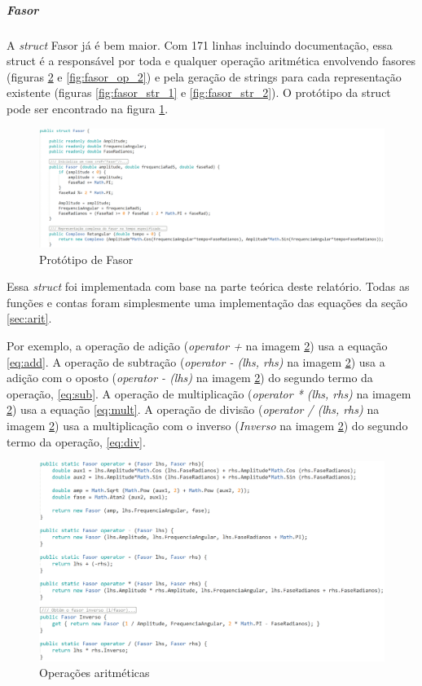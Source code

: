 \documentclass[conference,harvard, brazil]{sbatex}
\begin{document}
	\subparagraph{Fasor}A {\em struct} Fasor já é bem maior. Com 171 linhas incluindo documentação, essa struct é a responsável por toda e qualquer operação aritmética envolvendo fasores (figuras \ref{fig:fasor_op_1} e \ref{fig:fasor_op_2}) e pela geração de strings para cada representação existente (figuras \ref{fig:fasor_str_1} e \ref{fig:fasor_str_2}). O protótipo da struct pode ser encontrado na figura \ref{fig:fasor_prot}.
	\begin{figure}[h]
		\includegraphics[width=\columnwidth]{fasor_1}
		\caption{Protótipo de Fasor}
		\label{fig:fasor_prot}
	\end{figure}
	
	Essa {\em struct} foi implementada com base na parte teórica deste relatório. Todas as funções e contas foram simplesmente uma implementação das equações da seção \ref{sec:arit}.
	
	Por exemplo, a operação de adição ({\em operator +} na imagem \ref{fig:fasor_op_1}) usa a equação \ref{eq:add}. A operação de subtração ({\em operator - (lhs, rhs)} na imagem \ref{fig:fasor_op_1}) usa a adição com o oposto ({\em operator - (lhs)} na imagem \ref{fig:fasor_op_1}) do segundo termo da operação, \ref{eq:sub}.
	A operação de multiplicação  ({\em operator * (lhs, rhs)} na imagem \ref{fig:fasor_op_1}) usa a equação \ref{eq:mult}. A operação de divisão ({\em operator / (lhs, rhs)} na imagem \ref{fig:fasor_op_1}) usa a multiplicação com o inverso ({\em Inverso} na imagem \ref{fig:fasor_op_1})  do segundo termo da operação, \ref{eq:div}.
	\begin{figure}[h]
		\includegraphics[width=\columnwidth]{fasor_4}
		\caption{Operações aritméticas}
		\label{fig:fasor_op_1}
	\end{figure}
	
\end{document}
